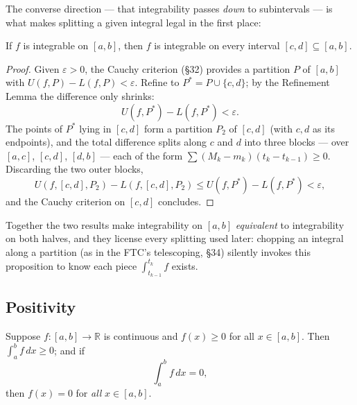 \documentclass[11pt]{report}
\begin{document}
The converse direction --- that integrability passes \emph{down} to subintervals --- is what makes splitting a given integral legal in the first place:

\begin{propbox}
If $f$ is integrable on $[a,b]$, then $f$ is integrable on every interval $[c,d] \subseteq [a,b]$.
\end{propbox}

\begin{proof}
Given $\varepsilon > 0$, the Cauchy criterion (\S 32) provides a partition $P$ of $[a,b]$ with $U(f,P) - L(f,P) < \varepsilon$. Refine to $P^* = P \cup \{c, d\}$; by the Refinement Lemma the difference only shrinks:
\[
U(f, P^*) - L(f, P^*) < \varepsilon.
\]
The points of $P^*$ lying in $[c,d]$ form a partition $P_2$ of $[c,d]$ (with $c, d$ as its endpoints), and the total difference splits along $c$ and $d$ into three blocks --- over $[a,c]$, $[c,d]$, $[d,b]$ --- each of the form $\sum (M_k - m_k)(t_k - t_{k-1}) \geq 0$. Discarding the two outer blocks,
\[
U(f, [c,d], P_2) - L(f, [c,d], P_2) \leq U(f, P^*) - L(f, P^*) < \varepsilon,
\]
and the Cauchy criterion on $[c,d]$ concludes.
\end{proof}

\begin{rembox}
Together the two results make integrability on $[a,b]$ \emph{equivalent} to integrability on both halves, and they license every splitting used later: chopping an integral along a partition (as in the FTC's telescoping, \S 34) silently invokes this proposition to know each piece $\int_{t_{k-1}}^{t_k} f$ exists.
\end{rembox}

\subsection{Positivity}

\begin{thmbox}
Suppose $f: [a,b] \to \mathbb{R}$ is continuous and $f(x) \geq 0$ for all $x \in [a,b]$. Then $\int_a^b f\,dx \geq 0$; and if
\[
\int_a^b f\,dx = 0,
\]
then $f(x) = 0$ for \emph{all} $x \in [a,b]$.
\end{thmbox}
\end{document}

